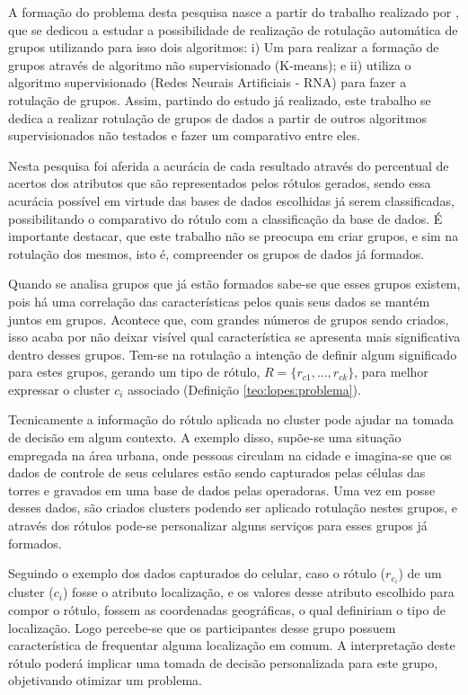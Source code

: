 A formação do problema desta pesquisa nasce a partir do trabalho realizado por , que se dedicou a estudar a possibilidade de realização de rotulação automática de grupos utilizando para isso dois algoritmos: i) Um para realizar a formação de grupos através de algoritmo não supervisionado (K-means); e ii) utiliza o algoritmo supervisionado (Redes Neurais Artificiais - RNA) para fazer a rotulação de grupos. Assim, partindo do estudo já realizado, este trabalho se dedica a realizar rotulação de grupos de dados a partir de outros algoritmos supervisionados não testados e fazer um comparativo entre eles.

Nesta pesquisa foi aferida a acurácia de cada resultado através do percentual de acertos dos atributos que são representados pelos rótulos gerados, sendo essa acurácia possível em virtude das bases de dados escolhidas já serem classificadas, possibilitando o comparativo do rótulo com a classificação da base de dados. É importante destacar, que este trabalho não se preocupa em criar grupos, e sim na rotulação dos mesmos, isto é, compreender os grupos de dados já formados.

Quando se analisa grupos que já estão formados sabe-se que esses grupos existem, pois há uma correlação das características pelos quais seus dados se mantém juntos em grupos. Acontece que, com grandes números de grupos sendo criados, isso acaba por não deixar visível qual característica se apresenta mais significativa dentro desses grupos. Tem-se na rotulação a intenção de definir algum significado para estes grupos, gerando um tipo de rótulo, ${ R=\{ r_{c1},...,r_{ck} \} }$, para melhor expressar o cluster ${c_i}$ associado (Definição \ref{teo:lopes:problema}).

Tecnicamente a informação do rótulo aplicada no cluster pode ajudar na tomada de decisão em algum contexto. A exemplo disso, supõe-se uma situação empregada na área urbana, onde pessoas circulam na cidade e imagina-se que os dados de controle de seus celulares estão sendo capturados pelas células das torres e gravados em uma base de dados pelas operadoras. Uma vez em posse desses dados, são criados clusters podendo ser aplicado rotulação nestes grupos, e através dos rótulos pode-se personalizar alguns serviços para esses grupos já formados. 

Seguindo o exemplo dos dados capturados do celular, caso o rótulo (${r_{c_i}}$) de um cluster (${c_i}$) fosse o atributo localização, e os valores desse atributo escolhido para compor o rótulo, fossem as coordenadas geográficas, o qual definiriam o tipo de localização. Logo percebe-se que os participantes desse grupo possuem característica de frequentar alguma localização em comum. A interpretação deste rótulo poderá implicar uma tomada de decisão personalizada para este grupo, objetivando otimizar um problema.

